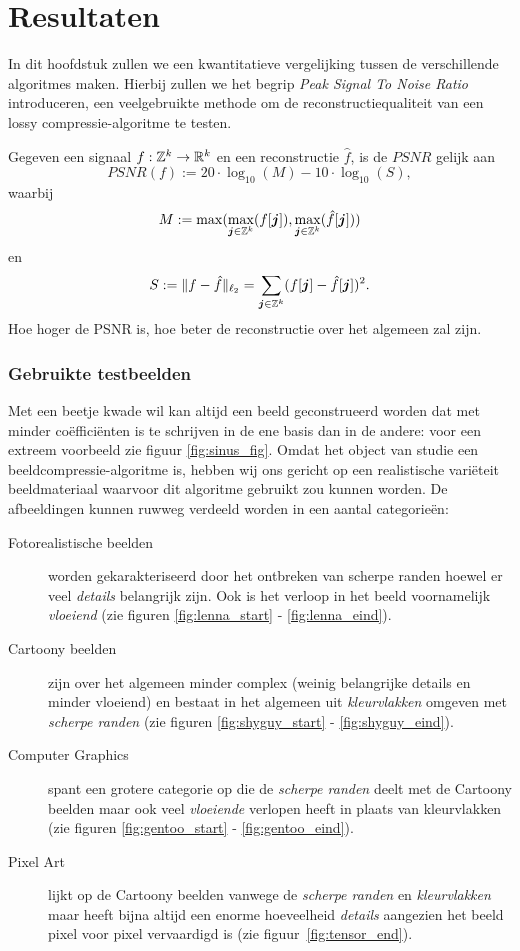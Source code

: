 \chapter{Resultaten}
\label{sectie_psnr}
In dit hoofdstuk zullen we een kwantitatieve vergelijking tussen de verschillende algoritmes maken. Hierbij zullen we het begrip \emph{Peak Signal To Noise Ratio} introduceren, een veelgebruikte methode om de reconstructiequaliteit van een lossy compressie-algoritme te testen.

\begin{definitie}
  Gegeven een signaal $f: \mathbb{Z}^k \to \mathbb{R}^k$ en een reconstructie $\hat f$, is de $PSNR$ gelijk aan
  \[
  PSNR(f) := 20 \cdot \log_{10}( M ) - 10 \cdot \log_{10}(S),
  \]
  waarbij
  \[
  M := \max( \max_{\boldsymbol j \in \mathbb{Z}^k} (f[\boldsymbol j]), \max_{\boldsymbol j \in \mathbb{Z}^k} (\hat f[\boldsymbol j]))
  \]
  en
  \[
  S := \| f - \hat f \|_{\ell_2} = \sum_{\boldsymbol j \in \mathbb{Z}^k} (f[\boldsymbol j] - \hat f[\boldsymbol j])^2.
  \]
  Hoe hoger de PSNR is, hoe beter de reconstructie over het algemeen zal zijn.	
\end{definitie}

\subsection{Gebruikte testbeelden}
\label{testjes}
Met een beetje kwade wil kan altijd een beeld geconstrueerd worden dat met minder co\"effici\"enten is te schrijven
in de ene basis dan in de andere: voor een extreem voorbeeld zie figuur \ref{fig:sinus_fig}.
Omdat het object van studie een beeldcompressie-algoritme is, hebben wij ons gericht op een realistische vari\"eteit
beeldmateriaal waarvoor dit algoritme gebruikt zou kunnen worden. 
De afbeeldingen kunnen ruwweg verdeeld worden in een aantal categorie\"en:
\begin{description}
\item[Fotorealistische beelden] worden gekarakteriseerd door het ontbreken van scherpe randen hoewel
  er veel \emph{details} belangrijk zijn. Ook is het verloop in het beeld voornamelijk \emph{vloeiend}
  (zie figuren \ref{fig:lenna_start} - \ref{fig:lenna_eind}).
\item[Cartoony beelden] zijn over het algemeen minder complex (weinig belangrijke details en minder vloeiend) 
  en bestaat in het algemeen uit \emph{kleurvlakken} omgeven met \emph{scherpe randen}
  (zie figuren \ref{fig:shyguy_start} - \ref{fig:shyguy_eind}).
\item [Computer Graphics] spant een grotere categorie op die de \emph{scherpe randen} deelt met de Cartoony beelden
  maar ook veel \emph{vloeiende} verlopen heeft in plaats van kleurvlakken
  (zie figuren \ref{fig:gentoo_start} - \ref{fig:gentoo_eind}).
\item[Pixel Art] lijkt op de Cartoony beelden vanwege de \emph{scherpe randen} en \emph{kleurvlakken}
  maar heeft bijna altijd een enorme hoeveelheid \emph{details} aangezien het beeld pixel voor pixel vervaardigd is (zie figuur~\ref{fig:tensor_end}).
\end{description}

